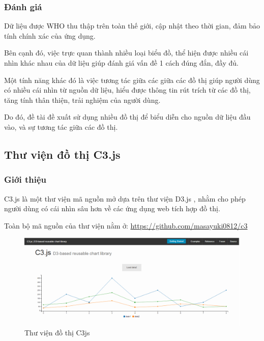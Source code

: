 \documentclass[12pt,a4paper]{article}
\begin{document}
\subsubsection{Đánh giá}
Dữ liệu được WHO thu thập trên toàn thế giới, cập nhật theo thời gian, đảm bảo tính chính xác của ứng dụng.

Bên cạnh đó, việc trực quan thành nhiều loại biểu đồ, thể hiện được nhiều cái nhìn khác nhau của dữ liệu giúp đánh giá vấn đề 1 cách đúng đắn, đầy đủ.

Một tính năng khác đó là việc tương tác giữa các giữa các đồ thị giúp người dùng có nhiều cái nhìn từ nguồn dữ liệu, hiểu được thông tin rút trích từ các đồ thị, tăng tính thân thiện, trải nghiệm của người dùng.

Do đó, đề tài đề xuất sử dụng nhiều đồ thị để biểu diễn cho nguồn dữ liệu đầu vào, và sự tương tác giữa các đồ thị.

\subsection{Thư viện đồ thị C3.js}
\subsubsection{Giới thiệu}
C3.js là một thư viện mã nguồn mở \cite{c3js} dựa trên thư viện D3.js , nhằm cho phép người dùng có cái nhìn sâu hơn về các ứng dụng web tích hợp đồ thị.

Toàn bộ mã nguồn của thư viện nằm ở: \url{https://github.com/masayuki0812/c3}
\begin{figure}[htp]
	\begin{center}
    \includegraphics[scale=.4]{image/c3js}
    \caption{Thư viện đồ thị C3js}
    \label{refhinh5}
	\end{center}
\end{figure}
\end{document}
